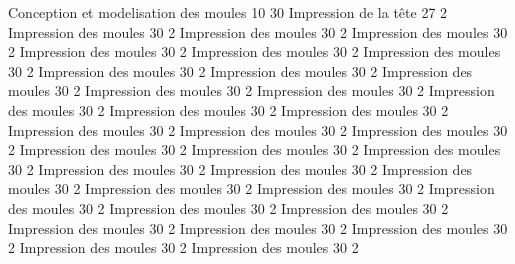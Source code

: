  {Conception et modelisation des moules} {10} {30}
 {Impression de la tête} {27} {2}
 {Impression des moules} {30} {2}
 {Impression des moules} {30} {2}
 {Impression des moules} {30} {2}
 {Impression des moules} {30} {2}
 {Impression des moules} {30} {2}
 {Impression des moules} {30} {2}
 {Impression des moules} {30} {2}
 {Impression des moules} {30} {2}
 {Impression des moules} {30} {2}
 {Impression des moules} {30} {2}
 {Impression des moules} {30} {2}
 {Impression des moules} {30} {2}
 {Impression des moules} {30} {2}
 {Impression des moules} {30} {2}
 {Impression des moules} {30} {2}
 {Impression des moules} {30} {2}
 {Impression des moules} {30} {2}
 {Impression des moules} {30} {2}
 {Impression des moules} {30} {2}
 {Impression des moules} {30} {2}
 {Impression des moules} {30} {2}
 {Impression des moules} {30} {2}
 {Impression des moules} {30} {2}
 {Impression des moules} {30} {2}
 {Impression des moules} {30} {2}
 {Impression des moules} {30} {2}
 {Impression des moules} {30} {2}
 {Impression des moules} {30} {2}
 {Impression des moules} {30} {2}
 {Impression des moules} {30} {2}
 {Impression des moules} {30} {2}
 {Impression des moules} {30} {2}
 {Impression des moules} {30} {2}
